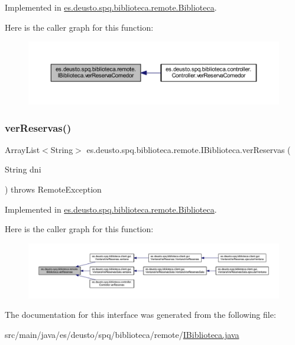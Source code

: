 Implemented in \mbox{\hyperlink{classes_1_1deusto_1_1spq_1_1biblioteca_1_1remote_1_1_biblioteca_a4bbd6c5f2df8f41fd0b5fb61564a1bfd}{es.\+deusto.\+spq.\+biblioteca.\+remote.\+Biblioteca}}.

Here is the caller graph for this function\+:
\nopagebreak
\begin{figure}[H]
\begin{center}
\leavevmode
\includegraphics[width=350pt]{interfacees_1_1deusto_1_1spq_1_1biblioteca_1_1remote_1_1_i_biblioteca_a95f0223ecd802f703977d838c72a93bf_icgraph}
\end{center}
\end{figure}
\mbox{\label{interfacees_1_1deusto_1_1spq_1_1biblioteca_1_1remote_1_1_i_biblioteca_a9ad945750f5db60c869a696e276f7421}} 
\subsubsection{\texorpdfstring{ver\+Reservas()}{verReservas()}}
{\footnotesize\ttfamily Array\+List$<$String$>$ es.\+deusto.\+spq.\+biblioteca.\+remote.\+I\+Biblioteca.\+ver\+Reservas (\begin{DoxyParamCaption}\item[{String}]{dni }\end{DoxyParamCaption}) throws Remote\+Exception}



Implemented in \mbox{\hyperlink{classes_1_1deusto_1_1spq_1_1biblioteca_1_1remote_1_1_biblioteca_a809e1bd178fbd41b865f827fd074e8c4}{es.\+deusto.\+spq.\+biblioteca.\+remote.\+Biblioteca}}.

Here is the caller graph for this function\+:
\nopagebreak
\begin{figure}[H]
\begin{center}
\leavevmode
\includegraphics[width=350pt]{interfacees_1_1deusto_1_1spq_1_1biblioteca_1_1remote_1_1_i_biblioteca_a9ad945750f5db60c869a696e276f7421_icgraph}
\end{center}
\end{figure}


The documentation for this interface was generated from the following file\+:\begin{DoxyCompactItemize}
\item 
src/main/java/es/deusto/spq/biblioteca/remote/\mbox{\hyperlink{_i_biblioteca_8java}{I\+Biblioteca.\+java}}\end{DoxyCompactItemize}
